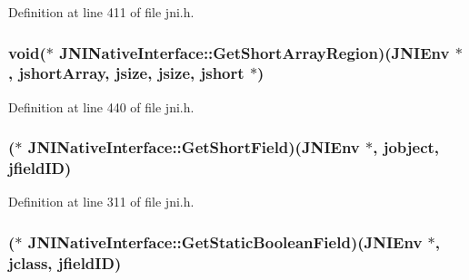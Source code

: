 Definition at line 411 of file jni.\-h.

\hypertarget{struct_j_n_i_native_interface_ae5b0ade0fe738eda317c62b03bcb8aac}{
\subsubsection[{Get\-Short\-Array\-Region}]{\setlength{\rightskip}{0pt plus 5cm}void($\ast$ J\-N\-I\-Native\-Interface\-::\-Get\-Short\-Array\-Region)({\bf J\-N\-I\-Env} $\ast$, {\bf jshort\-Array}, {\bf jsize}, {\bf jsize}, {\bf jshort} $\ast$)}}\label{struct_j_n_i_native_interface_ae5b0ade0fe738eda317c62b03bcb8aac}


Definition at line 440 of file jni.\-h.

\hypertarget{struct_j_n_i_native_interface_a1d3e0b2176d80884b1306f9d2ae8b95b}{
\subsubsection[{Get\-Short\-Field}]{($\ast$ J\-N\-I\-Native\-Interface\-::\-Get\-Short\-Field)({\bf J\-N\-I\-Env} $\ast$, {\bf jobject}, {\bf jfield\-I\-D})}}\label{struct_j_n_i_native_interface_a1d3e0b2176d80884b1306f9d2ae8b95b}


Definition at line 311 of file jni.\-h.

\hypertarget{struct_j_n_i_native_interface_ac4a6dc8040a27cc4d65c7a45a2d08773}{
\subsubsection[{Get\-Static\-Boolean\-Field}]{($\ast$ J\-N\-I\-Native\-Interface\-::\-Get\-Static\-Boolean\-Field)({\bf J\-N\-I\-Env} $\ast$, {\bf jclass}, {\bf jfield\-I\-D})}}\label{struct_j_n_i_native_interface_ac4a6dc8040a27cc4d65c7a45a2d08773}


